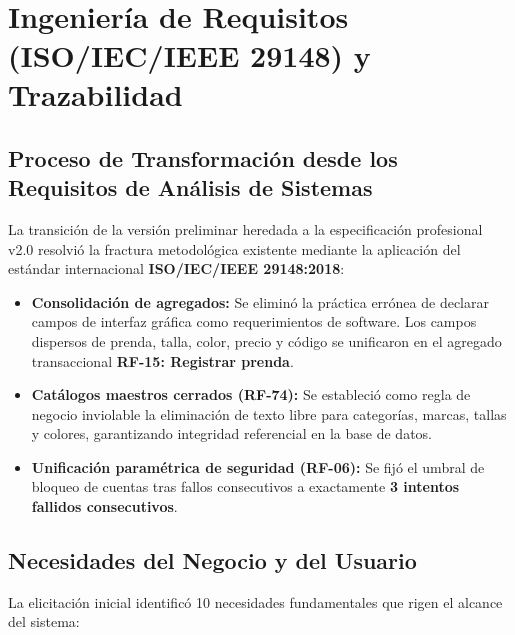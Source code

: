 ﻿﻿\chapter{Ingeniería de Requisitos (ISO/IEC/IEEE 29148) y Trazabilidad}

\section{Proceso de Transformación desde los Requisitos de Análisis de Sistemas}
La transición de la versión preliminar heredada a la especificación profesional v2.0 resolvió la fractura metodológica existente mediante la aplicación del estándar internacional \textbf{ISO/IEC/IEEE 29148:2018}:
\begin{itemize}
    \item \textbf{Consolidación de agregados:} Se eliminó la práctica errónea de declarar campos de interfaz gráfica como requerimientos de software. Los campos dispersos de prenda, talla, color, precio y código se unificaron en el agregado transaccional \textbf{RF-15: Registrar prenda}.
    \item \textbf{Catálogos maestros cerrados (RF-74):} Se estableció como regla de negocio inviolable la eliminación de texto libre para categorías, marcas, tallas y colores, garantizando integridad referencial en la base de datos.
    \item \textbf{Unificación paramétrica de seguridad (RF-06):} Se fijó el umbral de bloqueo de cuentas tras fallos consecutivos a exactamente \textbf{3 intentos fallidos consecutivos}.
\end{itemize}

\section{Necesidades del Negocio y del Usuario}
La elicitación inicial identificó 10 necesidades fundamentales que rigen el alcance del sistema:

